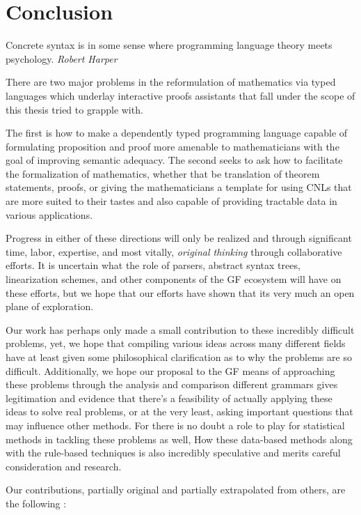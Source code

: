 \section{Conclusion}

\begin{displayquote}
Concrete syntax is in some sense where programming language theory meets
psychology. \emph{Robert Harper} 
\end{displayquote}

There are two major problems in the reformulation of mathematics via
typed languages which underlay interactive proofs assistants that fall under the
scope of this thesis tried to grapple with. 

The first is how to make a dependently typed programming language capable of
formulating proposition and proof more amenable to mathematicians with the goal
of improving semantic adequacy. The second seeks to ask how to facilitate the
formalization of mathematics, whether that be translation of theorem statements,
proofs, or giving the mathematicians a template for using CNLs that are more
suited to their tastes and also capable of providing tractable data in various
applications.

Progress in either of these directions will only be realized and through
significant time, labor, expertise, and most vitally, \emph{original thinking}
through collaborative efforts. It is uncertain what the role of parsers,
abstract syntax trees, linearization schemes, and other components of the GF
ecosystem will have on these efforts, but we hope that our efforts have shown
that its very much an open plane of exploration. 

Our work has perhaps only made a small contribution to these incredibly
difficult problems, yet, we hope that compiling various ideas across many
different fields have at least given some philosophical clarification as to why
the problems are so difficult. Additionally, we hope our proposal to the GF
means of approaching these problems through the analysis and comparison
different grammars gives legitimation and evidence that there's a feasibility of
actually applying these ideas to solve real problems, or at the very least,
asking important questions that may influence other methods. For there is no
doubt a role to play for statistical methods in tackling these problems as well,
How these data-based methods along with the rule-based techniques is
also incredibly speculative and merits careful consideration and research.

Our contributions, partially original and partially extrapolated from others,
are the following :

